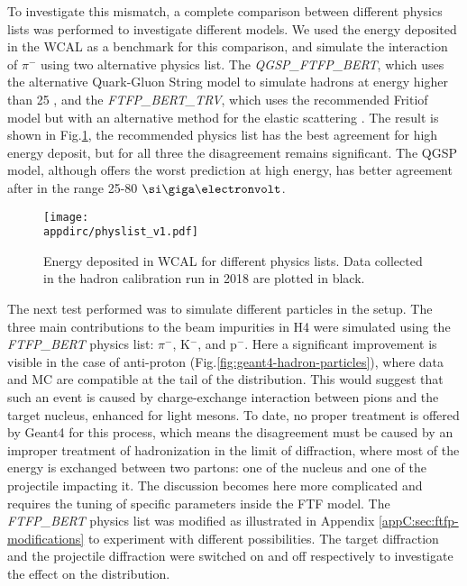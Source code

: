 To investigate this mismatch, a complete comparison between different physics lists was performed to investigate 
different models. We used the energy deposited in the WCAL as a benchmark for this comparison, and simulate the interaction of $\pi^-$ using two alternative physics list. The \textit{QGSP\_FTFP\_BERT}, which uses the alternative Quark-Gluon String model to simulate hadrons at energy higher than 25 \gev, and the \textit{FTFP\_BERT\_TRV}, which uses the recommended Fritiof model but with an alternative method for the elastic scattering \cite{AGOSTINELLI2003250}. The result is shown in Fig.\ref{fig:geant4-hadron-plist}, the recommended physics list has the best agreement for high energy deposit, but for all three the disagreement remains significant. The QGSP model, although offers the worst prediction at high energy, has better agreement after in the range 25-80 $\gev$.

\begin{figure}[tbh!]
  \centering
  \texttt{[image: \\appdirc/physlist\_v1.pdf]}
  \caption[Comparison of physics list for $\pi^-$ in WCAL energy spectrum]{Energy deposited in WCAL for different physics lists. Data collected in the hadron calibration run in 2018 are plotted in black.}
  \label{fig:geant4-hadron-plist}
\end{figure}

The next test performed was to simulate different particles in the setup. The three main contributions to the beam impurities in H4 were simulated using the \textit{FTFP\_BERT} physics list: $\pi^-$, K$^-$, and p$^-$. Here a significant improvement is visible in the case of anti-proton (Fig.\ref{fig:geant4-hadron-particles}), where data and MC are compatible at the tail of the distribution. This would suggest that such an event is caused by charge-exchange interaction between pions and the target nucleus, enhanced for light mesons. To date, no proper treatment is offered by Geant4 for this process, which means the disagreement must be caused by an improper treatment of hadronization in the limit of diffraction,  where most of the energy is exchanged between two partons: one of the nucleus and one of the projectile impacting it. The discussion becomes here more complicated and requires the tuning of specific parameters inside the FTF model.  The \textit{FTFP\_BERT} physics list was modified as illustrated in Appendix \ref{appC:sec:ftfp-modifications} to experiment with different possibilities. The target diffraction and the projectile diffraction were switched on and off respectively to investigate the effect on the distribution.


